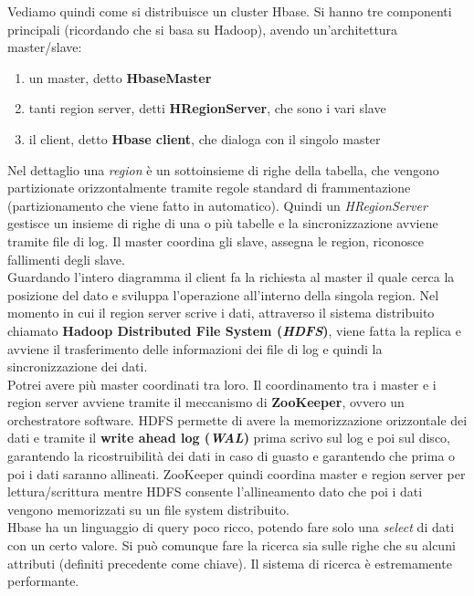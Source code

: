 Vediamo quindi come si distribuisce un cluster Hbase. Si hanno tre componenti principali (ricordando che si basa su Hadoop), avendo un'architettura master/slave: 
\begin{enumerate}
  \item un master, detto \textbf{HbaseMaster}
  \item tanti region server, detti \textbf{HRegionServer}, che sono i vari slave
  \item il client, detto \textbf{Hbase client}, che dialoga con il singolo master 
\end{enumerate}
Nel dettaglio una \textit{region} è un sottoinsieme di righe della tabella, che vengono partizionate orizzontalmente tramite regole standard di frammentazione (partizionamento che viene fatto in automatico). Quindi un \textit{HRegionServer} gestisce un insieme di righe di una o più tabelle e la sincronizzazione avviene tramite file di log. Il master coordina gli slave, assegna le region, riconosce fallimenti degli slave. \\

Guardando l'intero diagramma il client fa la richiesta al master il quale cerca la posizione del dato e sviluppa l'operazione all'interno della singola region. Nel momento in cui il region server scrive i dati, attraverso il sistema distribuito chiamato \textbf{Hadoop Distributed File System (\textit{HDFS})}, viene fatta la replica e avviene il trasferimento delle informazioni dei file di log e quindi la sincronizzazione dei dati.\\
Potrei avere più master coordinati tra loro. Il coordinamento tra i master e i region server avviene tramite il meccanismo di \textbf{ZooKeeper}, ovvero un orchestratore software. HDFS permette di avere la memorizzazione orizzontale dei dati e tramite il \textbf{write ahead log (\textit{WAL})} prima scrivo sul log e poi sul disco, garantendo la ricostruibilità dei dati in caso di guasto e garantendo che prima o poi i dati saranno allineati. ZooKeeper quindi coordina master e region server per lettura/scrittura mentre HDFS consente l'allineamento dato che poi i dati vengono memorizzati su un file system distribuito.\\ 
Hbase ha un linguaggio di query poco ricco, potendo fare solo una \textit{select} di dati con un certo valore. Si può comunque fare la ricerca sia sulle righe che su alcuni attributi (definiti precedente come chiave). Il sistema di ricerca è estremamente performante.
